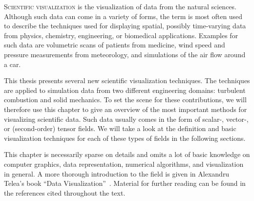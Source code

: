 \lettrine[lines=3, findent=-3.5pt, nindent=4pt, loversize=0.015,
lhang=0.08]{S}{cientific visualization} is the visualization of data from the
natural sciences.
%
Although such data can come in a variety of forms, the term is most often used
to describe the techniques used for displaying spatial, possibly time-varying
data from physics, chemistry, engineering, or biomedical applications.
%
Examples for such data are volumetric scans of patients from medicine, wind
speed and pressure measurements from meteorology, and simulations of the air
flow around a car.
%

%
This thesis presents several new scientific visualization techniques.
%
The techniques are applied to simulation data from two different engineering
domains: turbulent combustion and solid mechanics.
%
To set the scene for these contributions, we will therefore use this chapter to
give an overview of the most important methods for visualizing scientific data.
%
Such data usually comes in the form of scalar-, vector-, or (second-order)
tensor fields.
%
We will take a look at the definition and basic visualization techniques for
each of these types of fields in the following sections.
%

%
This chapter is necessarily sparse on details and omits a lot of basic knowledge
on computer graphics, data representation, numerical algorithms, and
visualization in general.
%
A more thorough introduction to the field is given in Alexandru Telea's book
``Data Visualization''~\cite{Telea2014}.
%
Material for further reading can be found in the references cited throughout the
text.
%